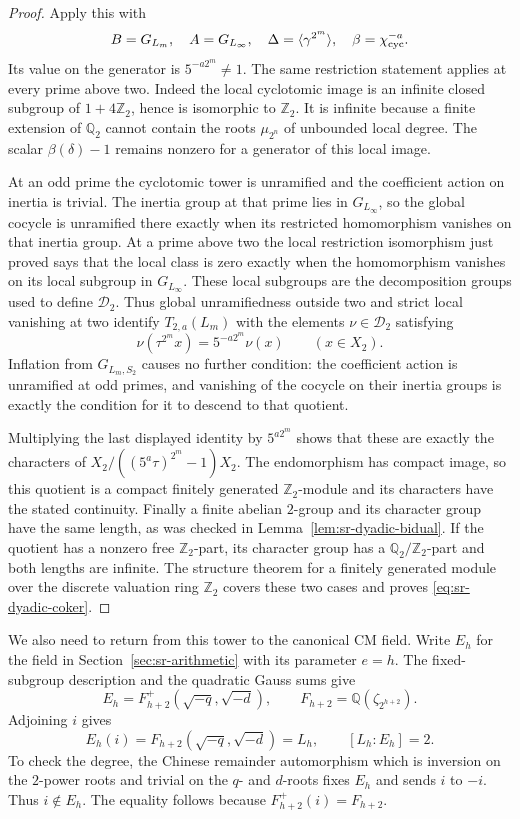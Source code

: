 \begin{proof}
Apply this with
\[
 B=G_{L_m},\quad A=G_{L_\infty},\quad
 \Delta=\langle\gamma^{2^m}\rangle,\quad
 \beta=\chi_{\rm cyc}^{-a}.
\]
Its value on the generator is \(5^{-a2^m}\ne1\).
The same restriction statement applies at every prime above two.
Indeed the local cyclotomic image is an infinite closed subgroup
of \(1+4\mathbb Z_2\), hence is isomorphic to \(\mathbb Z_2\).
It is infinite because a finite extension of \(\mathbb Q_2\)
cannot contain the roots \(\mu_{2^n}\) of unbounded local degree.
The scalar \(\beta(\delta)-1\) remains nonzero for a generator of
this local image.

At an odd prime the cyclotomic tower is unramified and the
coefficient action on inertia is trivial.
The inertia group at that prime lies in \(G_{L_\infty}\), so
the global cocycle is unramified there exactly when its restricted
homomorphism vanishes on that inertia group.
At a prime above two the local restriction isomorphism just proved
says that the local class is zero exactly when the homomorphism
vanishes on its local subgroup in \(G_{L_\infty}\).
These local subgroups are the decomposition groups used to
define \(\mathcal D_2\).
Thus global unramifiedness outside two and strict local vanishing
at two identify \(T_{2,a}(L_m)\) with the elements
\(\nu\in\mathcal D_2\) satisfying
\[
 \nu(\tau^{2^m}x)=5^{-a2^m}\nu(x)\qquad(x\in X_2).
\]
Inflation from \(G_{L_m,S_2}\) causes no further condition:
the coefficient action is unramified at odd primes, and vanishing
of the cocycle on their inertia groups is exactly the condition
for it to descend to that quotient.

Multiplying the last displayed identity by \(5^{a2^m}\)
shows that these are exactly the characters of
\(X_2/((5^a\tau)^{2^m}-1)X_2\).
The endomorphism has compact image, so this quotient is a compact
finitely generated \(\mathbb Z_2\)-module and its characters have
the stated continuity.
Finally a finite abelian \(2\)-group and its character group have
the same length, as was checked in Lemma~\ref{lem:sr-dyadic-bidual}.
If the quotient has a nonzero free \(\mathbb Z_2\)-part, its
character group has a \(\mathbb Q_2/\mathbb Z_2\)-part and both
lengths are infinite.
The structure theorem for a finitely generated module over the
discrete valuation ring \(\mathbb Z_2\) covers these two cases
and proves \eqref{eq:sr-dyadic-coker}.
\end{proof}

We also need to return from this tower to the canonical CM field.
Write \(E_h\) for the field in Section~\ref{sec:sr-arithmetic}
with its parameter \(e=h\).
The fixed-subgroup description and the quadratic Gauss sums give
\[
 E_h=F_{h+2}^{+}(\sqrt{-q},\sqrt{-d}),\qquad
 F_{h+2}=\mathbb Q(\zeta_{2^{h+2}}).
\]
Adjoining \(i\) gives
\[
 E_h(i)=F_{h+2}(\sqrt{-q},\sqrt{-d})=L_h,\qquad
 [L_h:E_h]=2 .
\]
To check the degree, the Chinese remainder automorphism which is
inversion on the \(2\)-power roots and trivial on the \(q\)- and
\(d\)-roots fixes \(E_h\) and sends \(i\) to \(-i\).
Thus \(i\notin E_h\).
The equality follows because \(F_{h+2}^{+}(i)=F_{h+2}\).

